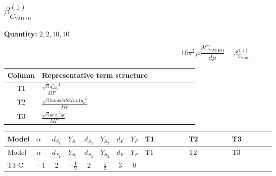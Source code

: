\documentclass[8pt]{article}
\begin{document}
\begin{landscape}
\section*{$\beta_{C_{221010}}^{(1)}$}
\noindent\textbf{Quantity: }$\mathrm{2,2,10,10}$\par\smallskip
\[16\pi^2\,\mu\frac{d C_{221010}}{d\mu}=\beta_{C_{221010}}^{(1)}\]
\begin{center}
\begin{tabular}{@{}c >{\raggedright\arraybackslash}p{0.82\linewidth}@{}}
\toprule
Column & Representative term structure \\
\midrule
T1 & \(\displaystyle \frac{\sqrt{3} g_{2}^{2} \overline{y_{2}}^{2}}{MF}\) \\
\midrule
T2 & \(\displaystyle \frac{\sqrt{3} lambdaS2Inv1 \overline{y_{2}}^{2}}{MF}\) \\
\midrule
T3 & \(\displaystyle \frac{\sqrt{3} ye \overline{y_{2}}^{2} \overline{ye}}{MF}\) \\
\midrule
\bottomrule
\end{tabular}
\end{center}
\smallskip
\tiny
\begin{longtable}{@{}llcccccc >{\raggedright\arraybackslash}p{0.21\linewidth} >{\raggedright\arraybackslash}p{0.21\linewidth} >{\raggedright\arraybackslash}p{0.21\linewidth}@{}}
\toprule
Model & $\alpha$ & $d_{S_1}$ & $Y_{S_1}$ & $d_{S_2}$ & $Y_{S_2}$ & $d_F$ & $Y_F$ & T1 & T2 & T3 \\
\midrule
\endfirsthead
\toprule
Model & $\alpha$ & $d_{S_1}$ & $Y_{S_1}$ & $d_{S_2}$ & $Y_{S_2}$ & $d_F$ & $Y_F$ & T1 & T2 & T3 \\
\midrule
\endhead
T3-C & $-1$ & $2$ & $-\frac{1}{2}$ & $2$ & $\frac{1}{2}$ & $3$ & $0$ & \scriptsize\adjustbox{max width=\linewidth}{$\begin{gathered} \frac{\sqrt{3} g_{2}^{2} \overline{y_{2}}^{2}}{4 MF}\end{gathered}$} & \scriptsize\adjustbox{max width=\linewidth}{$\begin{gathered} \frac{\sqrt{3} lambdaS2Inv1 \overline{y_{2}}^{2}}{6 MF}\end{gathered}$} & \scriptsize\adjustbox{max width=\linewidth}{$\begin{gathered} - \frac{\sqrt{3} ye \overline{y_{2}}^{2} \overline{ye}}{12 MF}\end{gathered}$} \\
\midrule
\bottomrule
\end{longtable}
\end{landscape}
\end{document}
